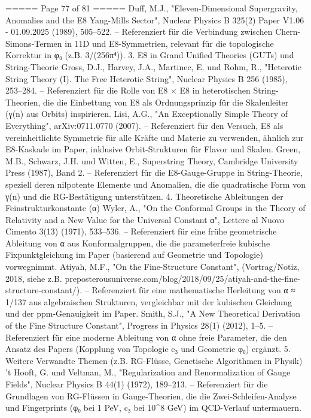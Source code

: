 \begin{MyVerbatim}
{{===== Page 77 of 81 =====
Duff, M.J., "Eleven-Dimensional Supergravity, Anomalies and the E8 Yang-Mills Sector", Nuclear Physics B 325(2)
Paper V1.06 - 01.09.2025
(1989), 505–522. – Referenziert für die Verbindung zwischen Chern-Simons-Termen in 11D und E8-Symmetrien,
relevant für die topologische Korrektur in φ₀ (z.B. 3/(256π⁴)).
3. E8 in Grand Unified Theories (GUTs) und String-Theorie
Gross, D.J., Harvey, J.A., Martinec, E. und Rohm, R., "Heterotic String Theory (I). The Free Heterotic String", Nuclear
Physics B 256 (1985), 253–284. – Referenziert für die Rolle von E8 × E8 in heterotischen String-Theorien, die die
Einbettung von E8 als Ordnungsprinzip für die Skalenleiter (γ(n) aus Orbits) inspirieren.
Lisi, A.G., "An Exceptionally Simple Theory of Everything", arXiv:0711.0770 (2007). – Referenziert für den Versuch,
E8 als vereinheitlichte Symmetrie für alle Kräfte und Materie zu verwenden, ähnlich zur E8-Kaskade im Paper,
inklusive Orbit-Strukturen für Flavor und Skalen.
Green, M.B., Schwarz, J.H. und Witten, E., Superstring Theory, Cambridge University Press (1987), Band 2. –
Referenziert für die E8-Gauge-Gruppe in String-Theorie, speziell deren nilpotente Elemente und Anomalien, die die
quadratische Form von γ(n) und die RG-Bestätigung unterstützen.
4. Theoretische Ableitungen der Feinstrukturkonstante (α)
Wyler, A., "On the Conformal Groups in the Theory of Relativity and a New Value for the Universal Constant α",
Lettere al Nuovo Cimento 3(13) (1971), 533–536. – Referenziert für eine frühe geometrische Ableitung von α aus
Konformalgruppen, die die parameterfreie kubische Fixpunktgleichung im Paper (basierend auf Geometrie und
Topologie) vorwegnimmt.
Atiyah, M.F., "On the Fine-Structure Constant", (Vortrag/Notiz, 2018, siehe z.B.
preposterousuniverse.com/blog/2018/09/25/atiyah-and-the-fine-structure-constant/). – Referenziert für eine
mathematische Herleitung von α ≈ 1/137 aus algebraischen Strukturen, vergleichbar mit der kubischen Gleichung
und der ppm-Genauigkeit im Paper.
Smith, S.J., "A New Theoretical Derivation of the Fine Structure Constant", Progress in Physics 28(1) (2012), 1–5. –
Referenziert für eine moderne Ableitung von α ohne freie Parameter, die den Ansatz des Papers (Kopplung von
Topologie c₃ und Geometrie φ₀) ergänzt.
5. Weitere Verwandte Themen (z.B. RG-Flüsse, Genetische Algorithmen in Physik)
't Hooft, G. und Veltman, M., "Regularization and Renormalization of Gauge Fields", Nuclear Physics B 44(1) (1972),
189–213. – Referenziert für die Grundlagen von RG-Flüssen in Gauge-Theorien, die die Zwei-Schleifen-Analyse und
Fingerprints (φ₀ bei 1 PeV, c₃ bei 10^8 GeV) im QCD-Verlauf untermauern.
}}
\end{MyVerbatim}

